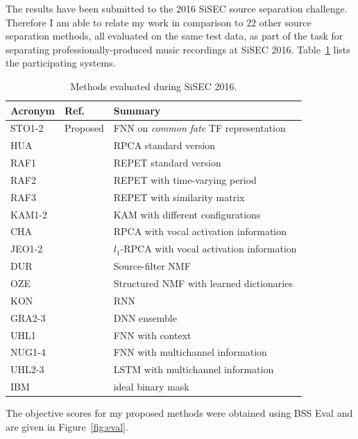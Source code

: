 
The results have been submitted to the 2016 SiSEC source separation challenge.
Therefore I am able to relate my work in comparison to $22$ other source separation methods, all evaluated on the same test data, as part of the task for separating professionally-produced music recordings at SiSEC 2016.
Table~\ref{tab:sisec_systems} lists the participating systems.
\begin{table}[htbp]
	\centering
	\caption{Methods evaluated during SiSEC 2016.}
	\label{tab:sisec_systems}
	\begin{tabular}{lll@{}}
		\hline
		\textbf{Acronym} & \textbf{Ref.} & \textbf{Summary}\\
		\hline
    STO1-2 & Proposed & FNN on \textit{common fate} TF representation \\
		HUA & \cite{huang12} & RPCA standard version \\
		RAF1 & \cite{rafii13} & REPET standard version \\
		RAF2 & \cite{liutkus12} & REPET with time-varying period \\
		RAF3 & \cite{rafii12} & REPET with similarity matrix \\
		KAM1-2 & \cite{liutkus15} & KAM with different configurations \\
		CHA & \cite{chan15} & RPCA with vocal activation information \\
		JEO1-2 & \cite{jeong17} &  $l_1$-RPCA with vocal activation information \\
		DUR & \cite{durrieu11} & Source-filter NMF \\
		OZE & \cite{salaun14} & Structured NMF with learned dictionaries \\
		KON & \cite{huang15} & RNN \\
		GRA2-3 & \cite{grais16} & DNN ensemble \\
		UHL1 & \cite{uhlich15} & FNN with context \\
		NUG1-4 & \cite{nugraha16} & FNN with multichannel information \\
		UHL2-3 & \cite{uhlich17} & LSTM with multichannel information \\
		IBM & & ideal binary mask \\
	\end{tabular}
\end{table}

The objective scores for my proposed methods were obtained using BSS Eval and are given in Figure~\ref{fig:eval}.

